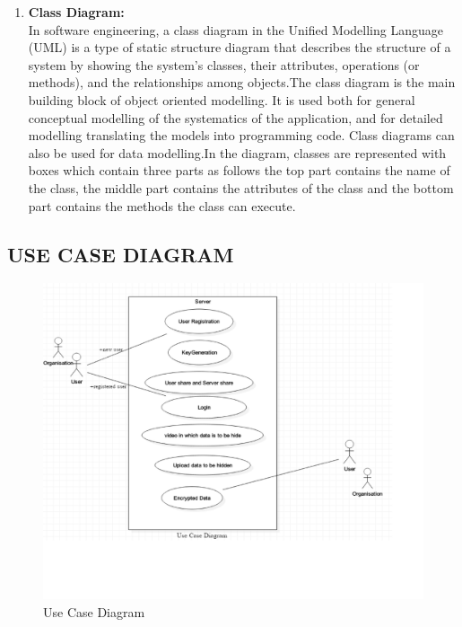 \documentclass[12pt]{extreport}
\begin{document}
\begin{enumerate}
\newpage
\item \textbf{Class Diagram:}\\
In software engineering, a class diagram in the Unified Modelling Language (UML) is a type of
static structure diagram that describes the structure of a system by showing the system's classes, their attributes, operations (or
methods), and the relationships among objects.The class diagram is the main building block of object oriented modelling. It is used both for general
conceptual modelling of the systematics of the application, and for detailed modelling translating the models into programming code. Class diagrams can also be used for data modelling.In the diagram, classes are represented with boxes which contain
three parts as follows the top part contains the name of the class, the middle part contains the attributes of the class and the bottom part contains the methods the class can execute.\\

\end{enumerate}

\pagebreak
    \subsection{USE CASE DIAGRAM}
    \begin{figure}[H]
    \centering
  \includegraphics[scale=0.2]{usecase.png}
  \caption{Use Case Diagram}
  
\end{figure}
    \pagebreak
\end{document}
